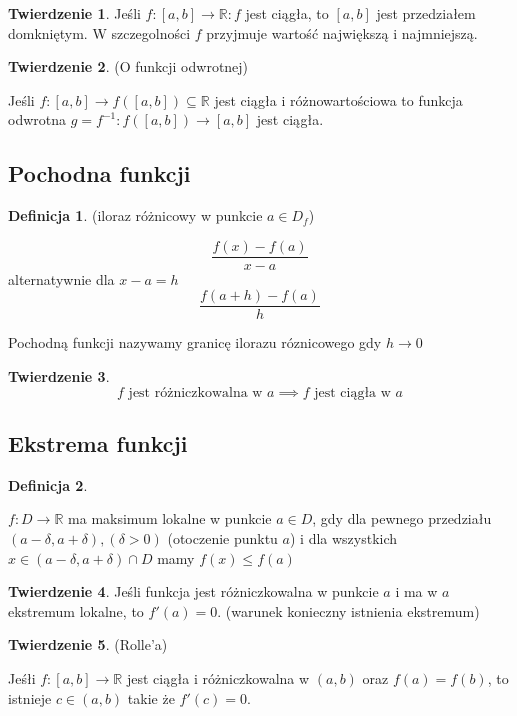 \documentclass{article}
\theoremstyle{definition}
\newtheorem{de}{Definicja}[subsection]
\theoremstyle{definition}
\newtheorem{tw}{Twierdzenie}[subsection]
\theoremstyle{definition}
\begin{document}
\begin{tw}
Jeśli $ f:[a,b] \to \mathbb{R} : f $ jest ciągła, to $ [a, b] $
jest przedziałem domkniętym. W szczegolności $f$ przyjmuje wartość 
największą i najmniejszą.
\end{tw}

\begin{tw}
(O funkcji odwrotnej)

Jeśli $ f: [a,b] \to f([a,b]) \subseteq \mathbb{R} $ jest ciągła i różnowartościowa
to funkcja odwrotna $ g=f^{-1}: f([a, b]) \to [a,b] $ jest ciągła.
\end{tw}

\subsection{Pochodna funkcji}

\begin{de}
(iloraz różnicowy w punkcie $ a \in D_f $)

$$
\frac{f(x) - f(a)}{x - a}
$$
alternatywnie dla $ x-a = h $
$$
\frac{f(a+h) - f(a)}{h}
$$

Pochodną funkcji nazywamy granicę ilorazu róznicowego gdy $h \to 0$
\end{de}

\begin{tw}
$$
f \text{ jest różniczkowalna w }a \implies f \text{ jest ciągła w } a
$$
\end{tw}
\subsection{Ekstrema funkcji}

\begin{de}
\

$f: D \to \mathbb{R}$ ma maksimum lokalne w punkcie $a \in D$, gdy dla 
pewnego przedziału $ (a - \delta, a+\delta),(\delta>0) $ (otoczenie punktu $a$)
i dla wszystkich $ x \in (a - \delta, a+\delta) \cap D $ mamy
$ f(x) \leq f(a) $
\end{de}

\begin{tw}
Jeśli funkcja jest różniczkowalna w punkcie $a$ i ma w $a$ ekstremum lokalne,
to $f'(a)=0$. (warunek konieczny istnienia ekstremum)
\end{tw}

\begin{tw}
(Rolle'a)

Jeśłi $f:[a,b] \to \mathbb{R}$ jest ciągła i różniczkowalna w $(a,b)$ oraz
$f(a) = f(b)$, to istnieje $c\in(a,b)$ takie że $f'(c)=0$.
\end{tw}
\end{document}
